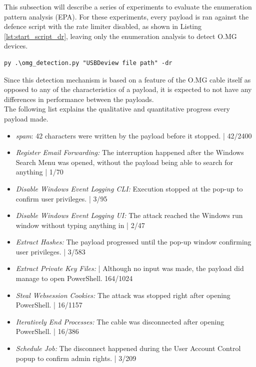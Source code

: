 This subsection will describe a series of experiments to evaluate the enumeration pattern analysis (EPA). For these experiments, every payload is ran against the defence script with the rate limiter disabled, as shown in Listing \ref{lst:start_script_dr}, leaving only the enumeration analysis to detect O.MG devices.

\begin{lstlisting}[caption={start defence Script with Rate Limiter disabled},label={lst:start_script_dr}, captionpos=b]
 py .\omg_detection.py "USBDeview file path" -dr
\end{lstlisting}

Since this detection mechanism is based on a feature of the O.MG cable itself as opposed to any of the characteristics of a payload, it is expected to not have any differences in performance between the payloads. \\
The following list explains the qualitative and quantitative progress every payload made.

\begin{itemize}
    \item  \emph{spam}: 42 characters were written by the payload before it stopped. | 42/2400
    \item  \emph{Register Email Forwarding:} The interruption happened after the Windows Search Menu was opened, without the payload being able to search for anything  |  1/70 
    \item  \emph{Disable Windows Event Logging CLI:}  Execution stopped at the pop-up to confirm user privileges. | 3/95
    \item  \emph{Disable Windows Event Logging UI:} The attack reached the Windows run window without typing anything in | 2/47
    \item  \emph{Extract Hashes:}  The payload progressed until the pop-up window confirming user privileges. | 3/583
    \item  \emph{Extract Private Key Files:}  | Although no input was made, the payload did manage to open PowerShell. 164/1024
    \item  \emph{Steal Websession Cookies:} The attack was stopped right after opening PowerShell. | 16/1157
    \item  \emph{Iteratively End Processes:} The cable was disconnected after opening PowerShell. | 16/386
    \item  \emph{Schedule Job:} The disconnect happened during the User Account Control popup to confirm admin rights. | 3/209
\end{itemize}

